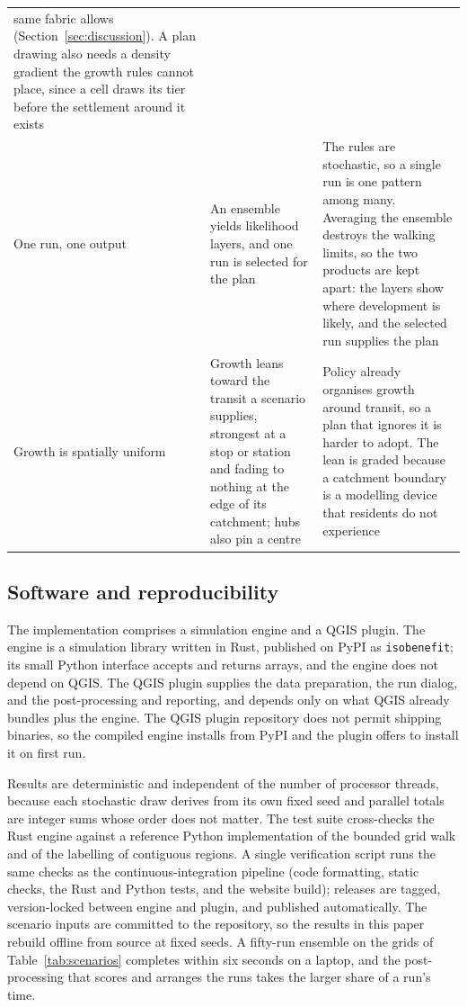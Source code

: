 \documentclass[11pt]{article}
\begin{document}
{\begin{xltabular}{\textwidth}{L L L}
    same fabric allows (Section~\ref{sec:discussion}). A plan drawing also needs a density gradient the growth rules
    cannot place, since a cell draws its tier before the settlement around
    it exists \\
    \addlinespace[3pt]
    One run, one output &
    An ensemble yields likelihood layers, and one run is selected for the
    plan &
    The rules are stochastic, so a single run is one pattern among many.
    Averaging the ensemble destroys the walking limits, so the two products
    are kept apart: the layers show where development is likely, and the
    selected run supplies the plan \\
    \addlinespace[3pt]
    Growth is spatially uniform &
    Growth leans toward the transit a scenario supplies, strongest at a stop
    or station and fading to nothing at the edge of its catchment; hubs also
    pin a centre &
    Policy already organises growth around transit, so a plan that ignores
    it is harder to adopt. The lean is graded because a catchment boundary
    is a modelling device that residents do not experience \\
\end{xltabular}}

\subsection{Software and reproducibility}
\label{sec:software}

The implementation comprises a simulation engine and a QGIS plugin.
The engine is a simulation library written in Rust, published on
PyPI as \texttt{isobenefit}; its small Python interface accepts and
returns arrays, and the engine does not depend on QGIS. The
QGIS plugin \citep{qgis} supplies the data preparation, the run
dialog, and the post-processing and reporting, and depends only on
what QGIS already bundles plus the engine. The QGIS plugin repository does not permit
shipping binaries, so the compiled engine installs from PyPI and the
plugin offers to install it on first run.

Results are deterministic and independent of the number of
processor threads, because
each stochastic draw derives from its own fixed seed and parallel
totals are integer sums whose order does not matter. The test suite
cross-checks the Rust engine against a reference Python
implementation of the bounded grid walk and of the labelling of
contiguous regions. A single verification script runs the same
checks as the continuous-integration pipeline (code formatting,
static checks, the Rust and Python tests, and the website build); releases are tagged,
version-locked between engine and plugin, and published
automatically. The scenario inputs are committed to the repository, so the results
in this paper rebuild offline from source at fixed seeds. A fifty-run
ensemble on the grids of Table~\ref{tab:scenarios} completes within
six seconds on a laptop, and the post-processing that scores and
arranges the runs takes the larger share of a run's time.
\end{document}
